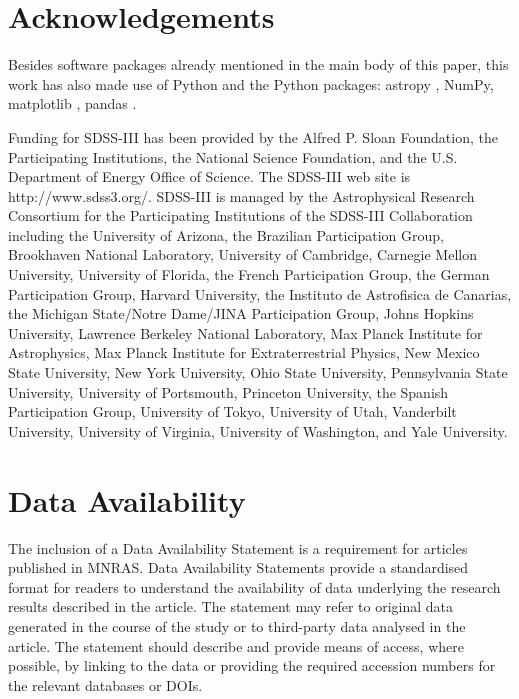 \documentclass[fleqn,usenatbib]{mnras}
\begin{document}
\section*{Acknowledgements}
Besides software packages already mentioned in the main body of this paper, this work has also made use of Python and the Python packages: astropy \citep{}, NumPy, matplotlib \citep{}, pandas \citep{}.

Funding for SDSS-III has been provided by the Alfred P. Sloan Foundation, the Participating Institutions, the National Science Foundation, and the U.S. Department of Energy Office of Science. The SDSS-III web site is http://www.sdss3.org/. SDSS-III is managed by the Astrophysical Research Consortium for the Participating Institutions of the SDSS-III Collaboration including the University of Arizona, the Brazilian Participation Group, Brookhaven National Laboratory, University of Cambridge, Carnegie Mellon University, University of Florida, the French Participation Group, the German Participation Group, Harvard University, the Instituto de Astrofisica de Canarias, the Michigan State/Notre Dame/JINA Participation Group, Johns Hopkins University, Lawrence Berkeley National Laboratory, Max Planck Institute for Astrophysics, Max Planck Institute for Extraterrestrial Physics, New Mexico State University, New York University, Ohio State University, Pennsylvania State University, University of Portsmouth, Princeton University, the Spanish Participation Group, University of Tokyo, University of Utah, Vanderbilt University, University of Virginia, University of Washington, and Yale University.  

\section*{Data Availability}

 
The inclusion of a Data Availability Statement is a requirement for articles published in MNRAS. Data Availability Statements provide a standardised format for readers to understand the availability of data underlying the research results described in the article. The statement may refer to original data generated in the course of the study or to third-party data analysed in the article. The statement should describe and provide means of access, where possible, by linking to the data or providing the required accession numbers for the relevant databases or DOIs.
\end{document}
